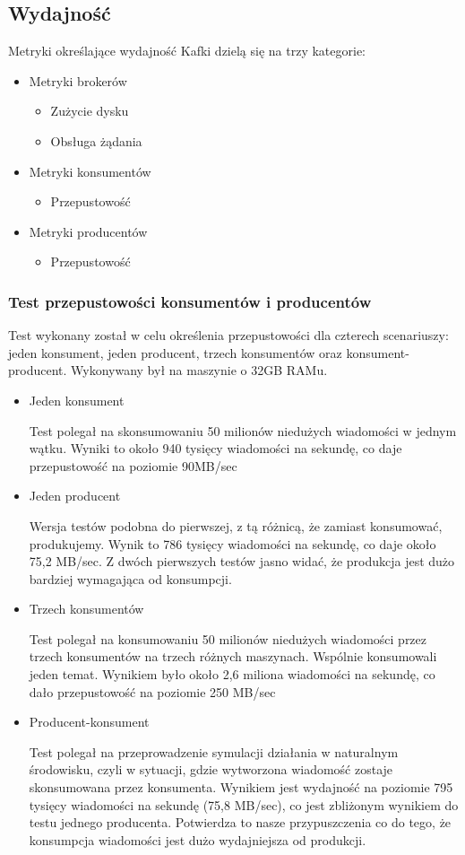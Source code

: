 \documentclass[a4paper,12pt]{article}
\begin{document}
\subsection{Wydajność}
Metryki określające wydajność Kafki dzielą się na trzy kategorie:
\begin{itemize}
\item Metryki brokerów
\begin{itemize}
\item Zużycie dysku
\item Obsługa żądania
\end{itemize}
\item Metryki konsumentów
\begin{itemize}
\item Przepustowość
\end{itemize}
\item Metryki producentów
\begin{itemize}
\item Przepustowość
\end{itemize}
\end{itemize}
\subsubsection{Test przepustowości konsumentów i producentów}
Test wykonany został w celu określenia przepustowości dla czterech scenariuszy: jeden konsument, jeden producent, trzech konsumentów oraz konsument-producent. Wykonywany był na maszynie o 32GB RAMu.
\begin{itemize}
\item Jeden konsument 


Test polegał na skonsumowaniu 50 milionów niedużych wiadomości w jednym wątku. Wyniki to około 940 tysięcy wiadomości na sekundę, co daje przepustowość na poziomie 90MB/sec
\item Jeden producent

Wersja testów podobna do pierwszej, z tą różnicą, że zamiast konsumować, produkujemy. Wynik to 786 tysięcy wiadomości na sekundę, co daje około 75,2 MB/sec. Z dwóch pierwszych testów jasno widać, że produkcja jest dużo bardziej wymagająca od konsumpcji. 
\item Trzech konsumentów

Test polegał na konsumowaniu 50 milionów niedużych wiadomości przez trzech konsumentów na trzech różnych maszynach. Wspólnie konsumowali jeden temat. Wynikiem było około 2,6 miliona wiadomości na sekundę, co dało przepustowość na poziomie 250 MB/sec
\item Producent-konsument

Test polegał na przeprowadzenie symulacji działania w naturalnym środowisku, czyli w sytuacji, gdzie wytworzona wiadomość zostaje skonsumowana przez konsumenta. Wynikiem jest wydajność na poziomie 795 tysięcy wiadomości na sekundę (75,8 MB/sec), co jest zbliżonym wynikiem do testu jednego producenta. Potwierdza to nasze przypuszczenia co do tego, że konsumpcja wiadomości jest dużo wydajniejsza od produkcji.
\end{itemize}
\end{document}
